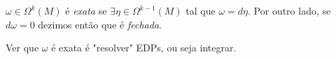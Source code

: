 

\vspace{-0.5cm}
\begin{definition}
    \(\omega \in \Omega^k(M)\) é \emph{exata} se \(\exists \eta \in \Omega^{k-1}(M)\) tal que \(\omega = d\eta\). Por outro lado, se \(d\omega = 0 \) dezimos então que é \emph{fechada}. 
\end{definition}
\begin{note}
    Ver que \(\omega \) é exata é "resolver" EDPs, ou seja integrar.
\end{note}
